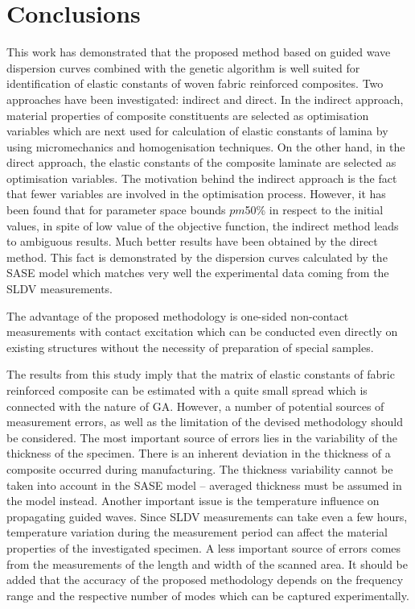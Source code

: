 \documentclass[preprint,12pt]{elsarticle}
\begin{document}
	\section{Conclusions}
	This work has demonstrated that the proposed method based on guided wave 
	dispersion curves combined with the genetic algorithm is well suited for identification 
	of elastic constants of woven fabric reinforced composites. Two approaches have 
	been investigated: indirect and direct.  In the indirect approach, material properties of 
	composite constituents are selected as optimisation variables which are next used 
	for calculation of elastic constants of lamina by using micromechanics and 
	homogenisation techniques. On the other hand, in the direct approach, the elastic 
	constants of the composite laminate are selected as optimisation variables. The 
	motivation behind the indirect approach is the fact that fewer variables are involved in 
	the optimisation process. However, it has been found that for parameter space 
	bounds  \(pm\)50\% in respect to the initial values, in spite of low value of the 
	objective function, the indirect method leads to ambiguous results.  Much better 
	results have been obtained by the direct method. This fact is demonstrated by the 
	dispersion curves calculated by the SASE model which matches very well the 
	experimental data coming from the SLDV measurements. 
	
	The advantage of the proposed methodology is one-sided non-contact measurements with contact excitation which can be conducted even directly on existing structures without the necessity of preparation of special samples.
	
	The results from this study imply that the matrix of elastic constants of fabric reinforced composite can be estimated with a quite small spread which is connected with the nature of GA. However, a number of potential sources of measurement errors, as well as the limitation of the devised methodology should be considered. The most important source of errors lies in the variability of the thickness of the specimen. There is an inherent deviation in the thickness of a composite occurred during manufacturing. The thickness variability cannot be taken into account in the SASE model -- averaged thickness must be assumed in the model instead. Another important issue is the temperature influence on propagating guided waves. Since SLDV measurements can take even a few hours, temperature variation during the measurement period can affect the material properties of the investigated specimen. A less important source of errors comes from the measurements of the length and width of the scanned area. It should be added that the accuracy of the proposed methodology depends on the frequency range and the respective number of modes which can be captured experimentally.
	
\end{document}
